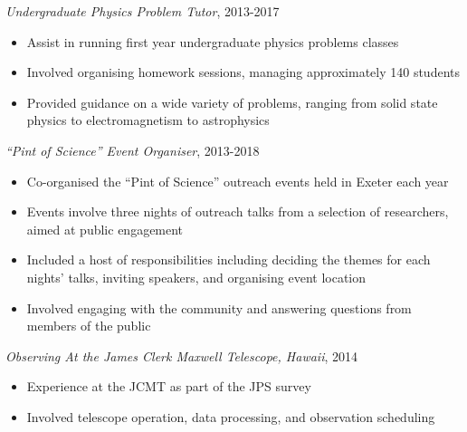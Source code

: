 \documentclass[letter, margin, 10pt]{res} %
\begin{document}
\begin{resume}
\vspace{-10pt}

{\sl Undergraduate Physics Problem Tutor}, 2013-2017
\begin{itemize}[noitemsep,topsep=0pt,parsep=0pt,partopsep=0pt]
\item Assist in running first year undergraduate physics problems classes
\item Involved organising homework sessions, managing approximately 140 students
\item Provided guidance on a wide variety of problems, ranging from solid state physics to electromagnetism to astrophysics
\end{itemize}

\vspace{-10pt}

{\sl ``Pint of Science'' Event Organiser}, 2013-2018
\begin{itemize}[noitemsep,topsep=0pt,parsep=0pt,partopsep=0pt]
\item Co-organised the ``Pint of Science'' outreach events held in Exeter each year
\item Events involve three nights of outreach talks from a selection of researchers, aimed at public engagement
\item Included a host of responsibilities including deciding the themes for each nights' talks, inviting speakers, and organising event location
\item Involved engaging with the community and answering questions from members of the public
\end{itemize}

\vspace{-10pt}

{\sl Observing At the James Clerk Maxwell Telescope, Hawaii}, 2014
\begin{itemize}[noitemsep,topsep=0pt,parsep=0pt,partopsep=0pt]
\item Experience at the JCMT as part of the JPS survey
\item Involved telescope operation, data processing, and observation scheduling
\end{itemize}

 





 

\end{resume}
\end{document}
